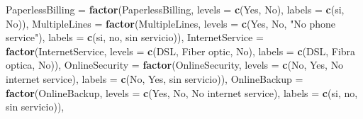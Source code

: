 \documentclass[
]{article}
\newenvironment{Shaded}{\begin{snugshade}}{\end{snugshade}}
\newcommand{\AttributeTok}[1]{\textcolor[rgb]{0.13,0.29,0.53}{#1}}
\newcommand{\FunctionTok}[1]{\textcolor[rgb]{0.13,0.29,0.53}{\textbf{#1}}}
\newcommand{\NormalTok}[1]{#1}
\newcommand{\StringTok}[1]{\textcolor[rgb]{0.31,0.60,0.02}{#1}}
\begin{document}
\begin{Shaded}
\begin{Highlighting}[]
    \AttributeTok{PaperlessBilling =} \FunctionTok{factor}\NormalTok{(PaperlessBilling, }\AttributeTok{levels =} \FunctionTok{c}\NormalTok{(}\StringTok{\textquotesingle{}Yes\textquotesingle{}}\NormalTok{, }\StringTok{\textquotesingle{}No\textquotesingle{}}\NormalTok{), }\AttributeTok{labels =} \FunctionTok{c}\NormalTok{(}\StringTok{\textquotesingle{}si\textquotesingle{}}\NormalTok{, }\StringTok{\textquotesingle{}No\textquotesingle{}}\NormalTok{)),}
    \AttributeTok{MultipleLines =} \FunctionTok{factor}\NormalTok{(MultipleLines, }\AttributeTok{levels =} \FunctionTok{c}\NormalTok{(}\StringTok{\textquotesingle{}Yes\textquotesingle{}}\NormalTok{, }\StringTok{\textquotesingle{}No\textquotesingle{}}\NormalTok{, }\StringTok{"No phone service"}\NormalTok{), }\AttributeTok{labels =} \FunctionTok{c}\NormalTok{(}\StringTok{\textquotesingle{}si\textquotesingle{}}\NormalTok{, }\StringTok{\textquotesingle{}no\textquotesingle{}}\NormalTok{, }\StringTok{\textquotesingle{}sin servicio\textquotesingle{}}\NormalTok{)),}
    \AttributeTok{InternetService =} \FunctionTok{factor}\NormalTok{(InternetService, }\AttributeTok{levels =} \FunctionTok{c}\NormalTok{(}\StringTok{\textquotesingle{}DSL\textquotesingle{}}\NormalTok{, }\StringTok{\textquotesingle{}Fiber optic\textquotesingle{}}\NormalTok{, }\StringTok{\textquotesingle{}No\textquotesingle{}}\NormalTok{), }\AttributeTok{labels =} \FunctionTok{c}\NormalTok{(}\StringTok{\textquotesingle{}DSL\textquotesingle{}}\NormalTok{, }\StringTok{\textquotesingle{}Fibra optica\textquotesingle{}}\NormalTok{, }\StringTok{\textquotesingle{}No\textquotesingle{}}\NormalTok{)),}
    \AttributeTok{OnlineSecurity =} \FunctionTok{factor}\NormalTok{(OnlineSecurity, }\AttributeTok{levels =} \FunctionTok{c}\NormalTok{(}\StringTok{\textquotesingle{}No\textquotesingle{}}\NormalTok{, }\StringTok{\textquotesingle{}Yes\textquotesingle{}}\NormalTok{, }\StringTok{\textquotesingle{}No internet service\textquotesingle{}}\NormalTok{), }\AttributeTok{labels =} \FunctionTok{c}\NormalTok{(}\StringTok{\textquotesingle{}No\textquotesingle{}}\NormalTok{, }\StringTok{\textquotesingle{}Yes\textquotesingle{}}\NormalTok{, }\StringTok{\textquotesingle{}sin servicio\textquotesingle{}}\NormalTok{)),}
    \AttributeTok{OnlineBackup =} \FunctionTok{factor}\NormalTok{(OnlineBackup, }\AttributeTok{levels =} \FunctionTok{c}\NormalTok{(}\StringTok{\textquotesingle{}Yes\textquotesingle{}}\NormalTok{, }\StringTok{\textquotesingle{}No\textquotesingle{}}\NormalTok{, }\StringTok{\textquotesingle{}No internet service\textquotesingle{}}\NormalTok{), }\AttributeTok{labels =} \FunctionTok{c}\NormalTok{(}\StringTok{\textquotesingle{}si\textquotesingle{}}\NormalTok{, }\StringTok{\textquotesingle{}no\textquotesingle{}}\NormalTok{, }\StringTok{\textquotesingle{}sin servicio\textquotesingle{}}\NormalTok{)),}

\end{Highlighting}
\end{Shaded}
\end{document}

